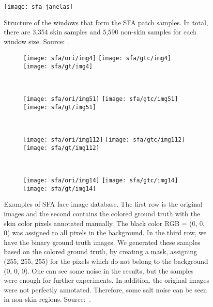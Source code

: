 \begin{figure}[H]
  \centering
  \texttt{[image: sfa-janelas]}
  \caption[Structure of the windows that form the SFA patch samples]{Structure of the windows that form the SFA patch samples. In total, there are 3,354 skin samples and 5,590 non-skin samples for each window size. Source: \citet{sfa-skin-dataset:13}.}
  \label{fig:sfa_dataset_janelas}
\end{figure}

\begin{figure}[H]
    \centering
    \begin{subfigure}[t]{0.2\textwidth}
        \texttt{[image: sfa/ori/img4]}
        \texttt{[image: sfa/gtc/img4]}
        \texttt{[image: sfa/gt/img4]}
    \end{subfigure}
    ~
    \begin{subfigure}[t]{0.2\textwidth}
        \texttt{[image: sfa/ori/img51]}
        \texttt{[image: sfa/gtc/img51]}
        \texttt{[image: sfa/gt/img51]}
    \end{subfigure}
    ~
    \begin{subfigure}[t]{0.2\textwidth}
        \texttt{[image: sfa/ori/img112]}
        \texttt{[image: sfa/gtc/img112]}
        \texttt{[image: sfa/gt/img112]}
    \end{subfigure}
    ~ %
    \begin{subfigure}[t]{0.2\textwidth}
        \texttt{[image: sfa/ori/img14]}
        \texttt{[image: sfa/gtc/img14]}
        \texttt{[image: sfa/gt/img14]}
    \end{subfigure}
    \caption[Examples of SFA face image database]{Examples of SFA face image database. The first row is the original images and the second contains the colored ground truth with the skin color pixels annotated manually. The black color RGB = (0, 0, 0) was assigned to all pixels in the background. In the third row, we have the binary ground truth images. We generated these samples based on the colored ground truth, by creating a mask, assigning (255, 255, 255) for the pixels which do not belong to the background (0, 0, 0). One can see some noise in the results, but the samples were enough for further experiments. In addition, the original images were not perfectly annotated. Therefore, some salt noise can be seen in non-skin regions. Source:~\citet{sfa-skin-dataset:13}.}
    \label{fig:sfa_dataset_exemplo}
\end{figure}

